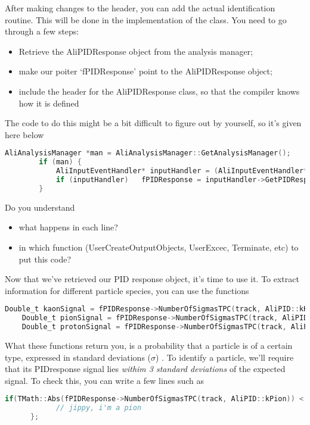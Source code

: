 \documentclass{article}
\begin{document}
After making changes to the header, you can add the actual identification routine. This will be done in the implementation of the class. You need to go through a few steps:

\begin{itemize}
\item Retrieve the AliPIDResponse object from the analysis manager;
\item make our poiter `fPIDResponse' point to the AliPIDResponse object;
\item include the header for the AliPIDResponse class, so that the compiler knows how it is defined
\end{itemize}

The code to do this might be a bit difficult to figure out by yourself, so it's given here below
\begin{lstlisting}[language=C, number=left]
        AliAnalysisManager *man = AliAnalysisManager::GetAnalysisManager();
        if (man) {
            AliInputEventHandler* inputHandler = (AliInputEventHandler*)(man->GetInputEventHandler());
            if (inputHandler)   fPIDResponse = inputHandler->GetPIDResponse();
        }\end{lstlisting}
Do you understand
\begin{itemize}
\item what happens in each line?
\item in which function (UserCreateOutputObjects, UserExcec, Terminate, etc) to put this code?
\end{itemize}

Now that we've retrieved our PID response object, it's time to use it. To extract information for different particle species, you can use the functions
\begin{lstlisting}[language=C, number=left]
    Double_t kaonSignal = fPIDResponse->NumberOfSigmasTPC(track, AliPID::kKaon);
    Double_t pionSignal = fPIDResponse->NumberOfSigmasTPC(track, AliPID::kPion);
    Double_t protonSignal = fPIDResponse->NumberOfSigmasTPC(track, AliPID::kProton);\end{lstlisting}

What these functions return you, is a probability that a particle is of a certain type, expressed in standard deviations ($\sigma$) . To identify a particle, we'll require that its PIDresponse signal lies \emph{withim 3 standard deviations} of the expected signal. To check this, you can write a few lines such as
\begin{lstlisting}[language=C, number=left]
      if(TMath::Abs(fPIDResponse->NumberOfSigmasTPC(track, AliPID::kPion)) < 3 ) {
            // jippy, i'm a pion
      };\end{lstlisting}
\end{document}
